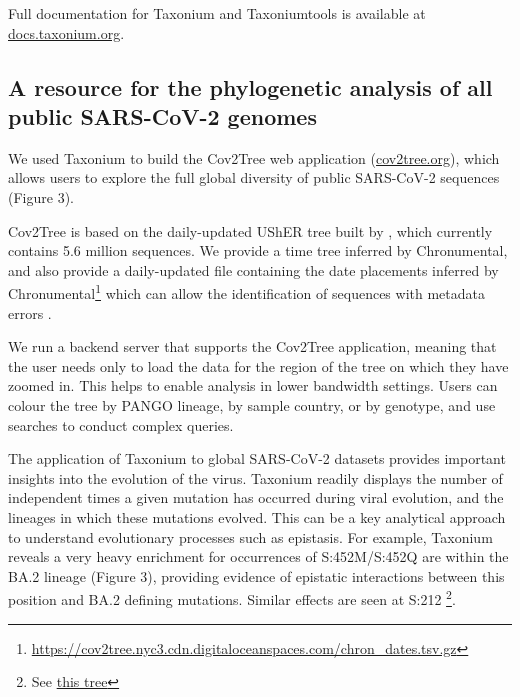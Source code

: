 \documentclass[twocolumn]{bioRxiv}
\begin{document}
Full documentation for Taxonium and Taxoniumtools is available at \href{http://docs.taxonium.org}{docs.taxonium.org}.

\subsection*{A resource for the phylogenetic analysis of all public SARS-CoV-2 genomes}

We used Taxonium to build the Cov2Tree web application (\href{http://cov2tree.org}{cov2tree.org}), which allows users to explore the full global diversity of public SARS-CoV-2 sequences (Figure 3). 

Cov2Tree is based on the daily-updated UShER tree built by \cite{McBroome2021}, which currently contains 5.6 million sequences. We provide a time tree inferred by Chronumental, and also provide a daily-updated file containing the date placements inferred by Chronumental\footnote{\url{https://cov2tree.nyc3.cdn.digitaloceanspaces.com/chron_dates.tsv.gz}} which can allow the identification of sequences with metadata errors \citep{chronumental}.

We run a backend server that supports the Cov2Tree application, meaning that the user needs only to load the data for the region of the tree on which they have zoomed in. This helps to enable analysis in lower bandwidth settings. Users can colour the tree by PANGO lineage, by sample country, or by genotype, and use searches to conduct complex queries.

The application of Taxonium to global SARS-CoV-2 datasets provides important insights into the evolution of the virus. Taxonium readily displays the number of independent times a given mutation has occurred during viral evolution, and the lineages in which these mutations evolved. This can be a key analytical approach to understand evolutionary processes such as epistasis. For example, Taxonium reveals a very heavy enrichment for occurrences of S:452M/S:452Q are within the BA.2 lineage (Figure 3), providing evidence of epistatic interactions between this position and BA.2 defining mutations. Similar effects are seen at S:212 \footnote{See \href{https://cov2tree.org/?srch=\%5B\%7B\%22key\%22\%3A\%22aa1\%22\%2C\%22type\%22\%3A\%22mutation\%22\%2C\%22method\%22\%3A\%22mutation\%22\%2C\%22text\%22\%3A\%22\%22\%2C\%22gene\%22\%3A\%22S\%22\%2C\%22position\%22\%3A\%22212\%22\%2C\%22new_residue\%22\%3A\%22any\%22\%2C\%22min_tips\%22\%3A\%2210\%22\%7D\%5D&color=\%7B\%22field\%22\%3A\%22None\%22\%7D}{this tree}}.
\end{document}
